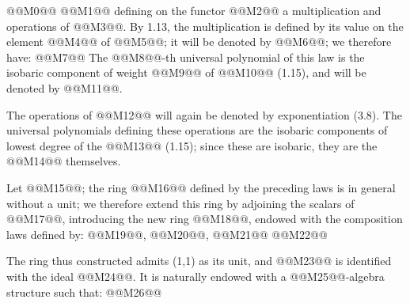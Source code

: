 @@M0@@
@@M1@@
defining on the functor @@M2@@ a multiplication and operations of @@M3@@. By 1.13, the multiplication is defined by its value on the element @@M4@@ of @@M5@@; it will be denoted by @@M6@@; we therefore have:
@@M7@@
The @@M8@@-th universal polynomial of this law is the isobaric component of weight @@M9@@ of @@M10@@ (1.15), and will be denoted by @@M11@@.

The operations of @@M12@@ will again be denoted by exponentiation (3.8). The universal polynomials defining these operations are the isobaric components of lowest degree of the @@M13@@ (1.15); since these are isobaric, they are the @@M14@@ themselves.

Let @@M15@@; the ring @@M16@@ defined by the preceding laws is in general without a unit; we therefore extend this ring by adjoining the scalars of @@M17@@, introducing the new ring @@M18@@, endowed with the composition laws defined by: @@M19@@, @@M20@@,
@@M21@@
@@M22@@

The ring thus constructed admits (1,1) as its unit, and @@M23@@ is identified with the ideal @@M24@@. It is naturally endowed with a @@M25@@-algebra structure such that:
@@M26@@

